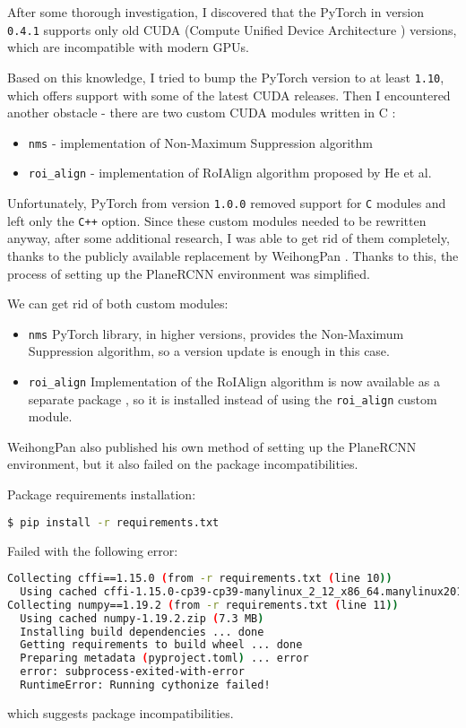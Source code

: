 After some thorough investigation,
I discovered that the PyTorch \cite{pytorch} in version \texttt{0.4.1}
supports only old CUDA (Compute Unified Device Architecture \cite{cuda-toolkit}) versions,
which are incompatible with modern GPUs.

\par

Based on this knowledge, I tried to bump the PyTorch version to at least \texttt{1.10},
which offers support with some of the latest CUDA releases.
Then I encountered another obstacle - there are two custom CUDA modules written in C \cite{c-language}:
\begin{itemize}
\item \texttt{nms} - implementation of Non-Maximum Suppression algorithm
\item \texttt{roi\_align} - implementation of RoIAlign algorithm proposed by He et al. \cite{inproceedingsMaskRCNN}
\end{itemize}

Unfortunately, PyTorch from version \texttt{1.0.0} removed support for \texttt{C} modules
and left only the \texttt{C++} \cite{cpp-language} option.
Since these custom modules needed to be rewritten anyway, after some additional research,
I was able to get rid of them completely,
thanks to the publicly available replacement by WeihongPan \cite{planercnn-repository-weihong-pan-fork}.
Thanks to this, the process of setting up the PlaneRCNN environment was simplified.

We can get rid of both custom modules:
\begin{itemize}
\item \texttt{nms}
PyTorch library, in higher versions, provides the Non-Maximum Suppression algorithm,
so a version update is enough in this case.
\item \texttt{roi\_align}
Implementation of the RoIAlign algorithm is now available as a separate package \cite{roialign-package},
so it is installed instead of using the \texttt{roi\_align} custom module.
\end{itemize}

\par

WeihongPan also published his own method of setting up the PlaneRCNN environment,
but it also failed on the package incompatibilities.

Package requirements installation:
\begin{lstlisting}[language=bash]
$ pip install -r requirements.txt
\end{lstlisting}
Failed with the following error:
\begin{lstlisting}[language=bash]
Collecting cffi==1.15.0 (from -r requirements.txt (line 10))
  Using cached cffi-1.15.0-cp39-cp39-manylinux_2_12_x86_64.manylinux2010_x86_64.whl.metadata (1.2 kB)
Collecting numpy==1.19.2 (from -r requirements.txt (line 11))
  Using cached numpy-1.19.2.zip (7.3 MB)
  Installing build dependencies ... done
  Getting requirements to build wheel ... done
  Preparing metadata (pyproject.toml) ... error
  error: subprocess-exited-with-error
  RuntimeError: Running cythonize failed!
\end{lstlisting}
which suggests package incompatibilities.

